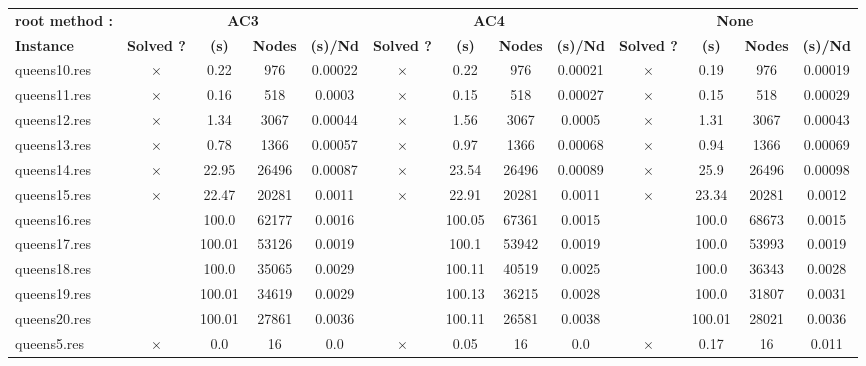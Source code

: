 \documentclass[main.tex]{subfiles}
\begin{document}
\thispagestyle{empty}

\begin{landscape}
\begin{center}
\renewcommand{\arraystretch}{1.4} 
\begin{tabular}{|l|cccc|cccc|cccc|}
	\hline
\textbf{root method :} & \multicolumn{4}{c}{\textbf{AC3}} & \multicolumn{4}{c}{\textbf{AC4}} & \multicolumn{4}{c}{\textbf{None}}\\
\textbf{Instance}  & \textbf{Solved ?} & \textbf{(s)} & \textbf{Nodes} & \textbf{(s)/Nd} & \textbf{Solved ?} & \textbf{(s)} & \textbf{Nodes} & \textbf{(s)/Nd} & \textbf{Solved ?} & \textbf{(s)} & \textbf{Nodes} & \textbf{(s)/Nd}\\\hline

queens10.res & $\times$ & 0.22 & 976 & 0.00022
 & $\times$ & 0.22 & 976 & 0.00021
 & $\times$ & 0.19 & 976 & 0.00019
\\
queens11.res & $\times$ & 0.16 & 518 & 0.0003
 & $\times$ & 0.15 & 518 & 0.00027
 & $\times$ & 0.15 & 518 & 0.00029
\\
queens12.res & $\times$ & 1.34 & 3067 & 0.00044
 & $\times$ & 1.56 & 3067 & 0.0005
 & $\times$ & 1.31 & 3067 & 0.00043
\\
queens13.res & $\times$ & 0.78 & 1366 & 0.00057
 & $\times$ & 0.97 & 1366 & 0.00068
 & $\times$ & 0.94 & 1366 & 0.00069
\\
queens14.res & $\times$ & 22.95 & 26496 & 0.00087
 & $\times$ & 23.54 & 26496 & 0.00089
 & $\times$ & 25.9 & 26496 & 0.00098
\\
queens15.res & $\times$ & 22.47 & 20281 & 0.0011
 & $\times$ & 22.91 & 20281 & 0.0011
 & $\times$ & 23.34 & 20281 & 0.0012
\\
queens16.res &  & 100.0 & 62177 & 0.0016
 &  & 100.05 & 67361 & 0.0015
 &  & 100.0 & 68673 & 0.0015
\\
queens17.res &  & 100.01 & 53126 & 0.0019
 &  & 100.1 & 53942 & 0.0019
 &  & 100.0 & 53993 & 0.0019
\\
queens18.res &  & 100.0 & 35065 & 0.0029
 &  & 100.11 & 40519 & 0.0025
 &  & 100.0 & 36343 & 0.0028
\\
queens19.res &  & 100.01 & 34619 & 0.0029
 &  & 100.13 & 36215 & 0.0028
 &  & 100.0 & 31807 & 0.0031
\\
queens20.res &  & 100.01 & 27861 & 0.0036
 &  & 100.11 & 26581 & 0.0038
 &  & 100.01 & 28021 & 0.0036
\\
queens5.res & $\times$ & 0.0 & 16 & 0.0
 & $\times$ & 0.05 & 16 & 0.0
 & $\times$ & 0.17 & 16 & 0.011
\\

\end{tabular}
\end{center}
\end{landscape}
\end{document}
